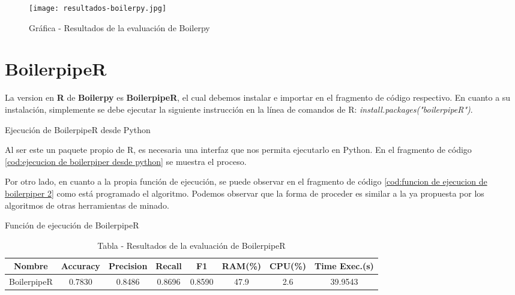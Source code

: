 \begin{figure}[tphb]
    \centering
    \texttt{[image: resultados-boilerpy.jpg]}
    \caption{Gráfica - Resultados de la evaluación de Boilerpy}
    \label{img:grafica - resultados de la evaluacion de boilerpy}
\end{figure}

\section*{BoilerpipeR}

La version en \textbf{R} de \textbf{Boilerpy} es \textbf{BoilerpipeR}, el cual debemos instalar e importar 
en el fragmento de código respectivo. En cuanto a su instalación, simplemente se debe ejecutar la siguiente 
instrucción en la línea de comandos de R: \emph{install.packages("boilerpipeR")}.

\begin{codefloat}
    
    \caption{Ejecución de BoilerpipeR desde Python}
    \label{cod:ejecucion de boilerpiper desde python}
\end{codefloat}

Al ser este un paquete propio de R, es necesaria una interfaz que nos permita ejecutarlo en Python. En el
fragmento de código \ref{cod:ejecucion de boilerpiper desde python} se muestra el proceso.

Por otro lado, en cuanto a la propia función de ejecución, se puede observar en el fragmento de código
\ref{cod:funcion de ejecucion de boilerpiper 2} como está programado el algoritmo. Podemos observar que la 
forma de proceder es similar a la ya propuesta por los algoritmos de otras herramientas de minado.

\begin{codefloat}
    
    \caption{Función de ejecución de BoilerpipeR}
    \label{cod:funcion de ejecucion de boilerpiper 2}
\end{codefloat}

\begin{table}[h]
    \begin{center}
      \begin{tabular}{| c | c | c | c | c | c | c | c |} \hline 
       \textbf{Nombre} & \textbf{Accuracy} & \textbf{Precision}  & \textbf{Recall} & \textbf{F1} & \textbf{RAM(\%)} & \textbf{CPU(\%)} & \textbf{Time Exec.(s)} \\ \hline
       BoilerpipeR & 0.7830 & 0.8486 & 0.8696 & 0.8590 & 47.9 & 2.6 & 39.9543 \\ \hline
      \end{tabular}
      \caption{Tabla - Resultados de la evaluación de BoilerpipeR}
      \label{tab:tabla - resultados de la evaluacion de boilerpiper}
    \end{center}
\end{table}

